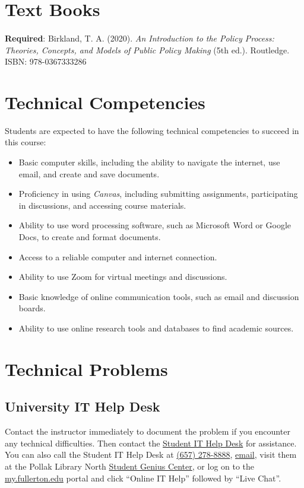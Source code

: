 \documentclass[11pt, letterpaper]{article}
\begin{document}
\section{Text Books}

\paragraph{}\noindent \textbf{Required}: Birkland, T. A. (2020). \emph{An Introduction to the Policy Process: Theories, Concepts, and Models of Public Policy Making} (5th ed.). Routledge. ISBN: 978-0367333286

\section{Technical Competencies}

Students are expected to have the following technical competencies to succeed in this course:
\begin{itemize}
    \item Basic computer skills, including the ability to navigate the internet, use email, and create and save documents.
    \item Proficiency in using \emph{Canvas}, including submitting assignments, participating in discussions, and accessing course materials.
    \item Ability to use word processing software, such as Microsoft Word or Google Docs, to create and format documents.
    \item Access to a reliable computer and internet connection.
    \item Ability to use Zoom for virtual meetings and discussions.
    \item Basic knowledge of online communication tools, such as email and discussion boards.
    \item Ability to use online research tools and databases to find academic sources.
\end{itemize}

\section{Technical Problems}

\subsection*{University IT Help Desk}

Contact the instructor immediately to document the problem if you encounter any technical difficulties. Then contact the \href{http://www.fullerton.edu/it/students/helpdesk/index.php}{Student IT Help Desk} for assistance. You can also call the Student IT Help Desk at \href{tel:+16572788888}{(657) 278-8888}, \href{mailto:StudentITHelpDesk@fullerton.edu}{email}, visit them at the Pollak Library North \href{http://www.fullerton.edu/it/students/sgc/index.php}{Student Genius Center}, or log on to the \href{http://my.fullerton.edu/}{my.fullerton.edu} portal and click ``Online IT Help'' followed by ``Live Chat''.
\end{document}

